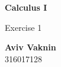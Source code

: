 \documentclass[a4paper, 12pt]{article}
\begin{document}
    \begin{center}
        \vspace*{4.4cm}
            
        \Huge
        \textbf{Calculus I}
            
        \vspace{0.5cm}
        \LARGE
        Exercise 1

        \vfill
            
        \Large
        \textbf{Aviv Vaknin}\\316017128
                    
    \end{center}
\end{document}

